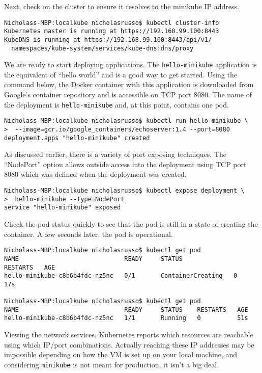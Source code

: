Next, check on the cluster to ensure it resolves to the minikube IP address.

\begin{verbatim}
Nicholass-MBP:localkube nicholasrusso$ kubectl cluster-info
Kubernetes master is running at https://192.168.99.100:8443
KubeDNS is running at https://192.168.99.100:8443/api/v1/
  namespaces/kube-system/services/kube-dns:dns/proxy
\end{verbatim}

We are ready to start deploying applications. The \verb|hello-minikube| application
is the equivalent of ``hello world'' and is a good way to get started. Using the
command below, the Docker container with this application is downloaded from
Google's container repository and is accessible on TCP port 8080. The name of
the deployment is \verb|hello-minikube| and, at this point, contains one pod.

\begin{verbatim}
Nicholass-MBP:localkube nicholasrusso$ kubectl run hello-minikube \
>  --image=gcr.io/google_containers/echoserver:1.4 --port=8080
deployment.apps "hello-minikube" created
\end{verbatim}

As discussed earlier, there is a variety of port exposing techniques. The
``NodePort'' option allows outside access into the deployment using TCP port
8080 which was defined when the deployment was created.

\begin{verbatim}
Nicholass-MBP:localkube nicholasrusso$ kubectl expose deployment \
>  hello-minikube --type=NodePort
service "hello-minikube" exposed
\end{verbatim}

Check the pod status quickly to see that the pod is still in a state of creating the
container. A few seconds later, the pod is operational.

\begin{verbatim}
Nicholass-MBP:localkube nicholasrusso$ kubectl get pod
NAME                             READY     STATUS              RESTARTS   AGE
hello-minikube-c8b6b4fdc-nz5nc   0/1       ContainerCreating   0          17s

Nicholass-MBP:localkube nicholasrusso$ kubectl get pod
NAME                             READY     STATUS    RESTARTS   AGE
hello-minikube-c8b6b4fdc-nz5nc   1/1       Running   0          51s
\end{verbatim}

Viewing the network services, Kubernetes reports which resources are reachable
using which IP/port combinations. Actually reaching these IP addresses may be
impossible depending on how the VM is set up on your local machine, and
considering \verb|minikube| is not meant for production, it isn't a big deal.

